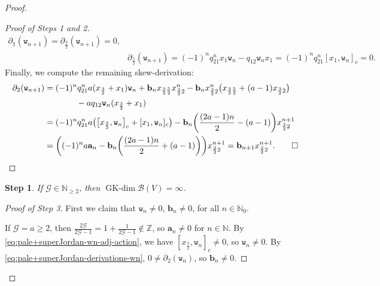 \documentclass[10pt,a4paper]{amsart}
\providecommand{\qed}{\ensuremath{\square}}
\numberwithin{equation}{section}
\newtheorem{stepv}{Step}
\newcommand{\GK}{\operatorname{GK-dim}}
\newcommand{\toba}{\mathscr B}
\newcommand{\ghost}{\mathscr{G}}
\newcommand{\ab}{\mathbf a}
\newcommand{\bb}{\mathbf b}
\newcommand{\N}{{\mathbb N}}
\newcommand{\Z}{{\mathbb Z}}
\newcommand{\wt}{\mathtt{w}}
\newcommand{\tresdos}{\frac{3}{2}}
\newcommand{\cincodos}{\frac{5}{2}}
\begin{document}
\begin{proof}
\begin{proof}[Proof of Steps 1 and 2]
\begin{align*}
\partial_1 (\wt_{n+1})=\partial_{\tresdos}(\wt_{n+1})=0,
\\
&\partial_{\cincodos} (\wt_{n+1})
= (-1)^{n} q_{21}^{n}x_1 \wt_n -q_{12}\wt_n x_1
= (-1)^{n} q_{21}^{n} [x_1, \wt_n]_c=0.
\end{align*}
Finally, we compute the remaining skew-derivation:
\begin{align*}
\partial_{2} (\wt_{n+1})
&= (-1)^{n} q_{21}^{n}a(x_{\tresdos}+x_1) \wt_n+\bb_n x_{\tresdos\cincodos}x_{\tresdos2}^{n}
-\bb_n x_{\tresdos2}^{n} \big(x_{\tresdos\cincodos}+(a-1)x_{\tresdos2}\big)
\\ &\hphantom{\partial_{2} (\wt_{n+1})}
-aq_{12}\wt_n (x_{\tresdos}+x_1)
\\
&= (-1)^{n} q_{21}^{n}a \big(\big[x_{\tresdos},\wt_n\big]_c + [x_{1},\wt_n]_c\big)
-\bb_n \bigg(\frac{(2a-1)n}{2}-(a-1)\bigg)x_{\tresdos2}^{n+1}
\\
&= \bigg((-1)^{n} a \ab_n -\bb_n \bigg(\frac{(2a-1)n}{2}+(a-1)\bigg)\bigg) x_{\tresdos2}^{n+1}
= \bb_{n+1} x_{\tresdos2}^{n+1}. \tag*{\qed}
\end{align*}
\renewcommand{\qed}{}
\end{proof}

\begin{stepv}%
If $\ghost\in\N_{\ge 2}$, then $\GK \toba(V)=\infty$.
\end{stepv}

\begin{proof}[Proof of Step 3]
First we claim that $\wt_n \ne 0$, $\bb_n \ne 0$, for all $n\in\N_0$.

If $\ghost=a\ge 2$, then $\tfrac{2\ghost}{2\ghost-1}=1+\tfrac{1}{2\ghost-1}\notin\Z$, so $\ab_n\ne 0$ for $n\in\N$.
By \eqref{eq:pale+superJordan-wn-adj-action}, we have $[x_{\tresdos},\wt_n]_c\ne 0$, so $\wt_n \ne 0$.
By \eqref{eq:pale+superJordan-derivations-wn}, $0\ne \partial_2(\wt_n)$, so $\bb_{n}\ne 0$.


\end{proof}
\end{proof}
\end{document}

